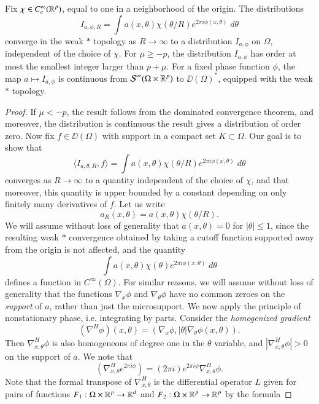 \begin{theorem}
    Fix $\chi \in C_c^\infty(\operatorname{\mathbb{R}}^p)$, equal to one in a neighborhood of the origin. The distributions
    \[ I_{a,\phi,R} = \int a(x,\theta) \chi(\theta / R) e^{2 \pi i \phi(x,\theta)}\; d\theta \]
    converge in the weak $*$ topology as $R \to \infty$ to a distribution $I_{a,\phi}$ on $\Omega$, independent of the choice of $\chi$. For $\mu \geq -p$, the distribution $I_{a,\phi}$ has order at most the smallest integer larger than $p + \mu$. For a fixed phase function $\phi$, the map $a \mapsto I_{a,\phi}$ is continuous from $\operatorname{\mathcal{S}}^\infty(\Omega \times \operatorname{\mathbb{R}}^p)$ to $\DD(\Omega)^*$, equipped with the weak $*$ topology.
\end{theorem}
\begin{proof}
    If $\mu < -p$, the result follows from the dominated convergence theorem, and moreover, the distribution is continuous the result gives a distribution of order zero. Now fix $f \in \DD(\Omega)$ with support in a compact set $K \subset \Omega$. Our goal is to show that
    \[ \langle I_{a,\theta,R}, f \rangle = \int a(x,\theta) \chi(\theta / R) e^{2 \pi i \phi(x,\theta)}\; d\theta \]
    converges as $R \to \infty$ to a quantity independent of the choice of $\chi$, and that moreover, this quantity is upper bounded by a constant depending on only finitely many derivatives of $f$. Let us write
    \[ a_R(x,\theta) = a(x, \theta) \chi(\theta / R). \]
    We will assume without loss of generality that $a(x,\theta) = 0$ for $|\theta| \leq 1$, since the resulting weak $*$ convergence obtained by taking a cutoff function supported away from the origin is not affected, and the quantity
    \[ \int a(x,\theta) \chi(\theta) e^{2 \pi i \phi(x,\theta)}\; d\theta \]
    defines a function in $C^\infty(\Omega)$. For similar reasons, we will assume without loss of generality that the functions $\nabla_x \phi$ and $\nabla_\theta \phi$ have no common zeroes on the \emph{support} of $a$, rather than just the microsupport. We now apply the principle of nonstationary phase, i.e. integrating by parts. Consider the \emph{homogenized gradient}
    \[ (\nabla^H \phi)(x,\theta) = ( \nabla_x \phi, |\theta| \nabla_\theta \phi(x,\theta) ). \]
    Then $\nabla_{x,\theta}^H \phi$ is also homogeneous of degree one in the $\theta$ variable, and $|\nabla_{x,\theta}^H \phi| > 0$ on the support of $a$. We note that
    \[ (\nabla_{x,\theta}^H e^{2 \pi i \phi} ) = (2 \pi i) e^{2 \pi i \phi} \nabla_{x,\theta}^H \phi. \]
    Note that the formal transpose of $\nabla_{x,\theta}^H$ is the differential operator $L$ given for pairs of functions $F_1: \Omega \times \operatorname{\mathbb{R}}^p \to \operatorname{\mathbb{R}}^d$ and $F_2: \Omega \times \operatorname{\mathbb{R}}^p \to \operatorname{\mathbb{R}}^p$ by the formula

\end{proof}
